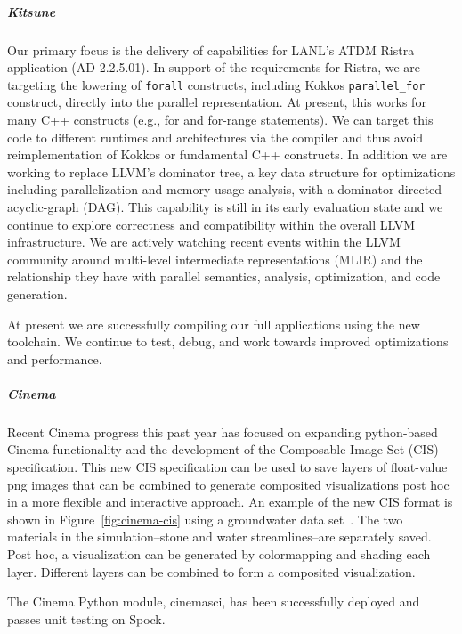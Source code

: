 \subparagraph{Kitsune}
Our primary focus is the delivery of capabilities for LANL's ATDM
Ristra application (AD 2.2.5.01).  In support of the requirements for
Ristra, we are targeting the lowering of \texttt{forall} constructs,
including Kokkos \texttt{parallel\_for} construct, directly into the
parallel representation.  At present, this works for many C++ constructs
(e.g., for and for-range statements).  We can target this code to different
runtimes and architectures via the compiler and thus avoid reimplementation
of Kokkos or fundamental C++ constructs. In addition we are working to replace
LLVM's dominator tree, a key data structure for optimizations including
parallelization and memory usage analysis, with a dominator directed-acyclic-graph
(DAG).  This capability is still in its early evaluation state and we continue to
explore correctness and compatibility within the overall LLVM infrastructure. We are
actively watching recent events within the LLVM community around
multi-level intermediate representations (MLIR) and the relationship
they have with parallel semantics, analysis, optimization, and code
generation.

At present we are successfully compiling our full applications using the new
toolchain.  We continue to test, debug, and work towards improved optimizations
and performance. 

\subparagraph{Cinema}
Recent Cinema progress this past year has focused on expanding python-based Cinema functionality and the development of the Composable Image Set (CIS) specification. This new CIS specification can be used to save layers of float-value png images that can be combined to generate composited visualizations post hoc in a more flexible and interactive approach.  An example of the new CIS format is shown in Figure~\ref{fig:cinema-cis} using a groundwater data set~\cite{cis:garcia:limestone}.  The two materials in the simulation--stone and water streamlines--are separately saved.  Post hoc, a visualization can be generated by colormapping and shading each layer.  Different layers can be combined to form a composited visualization.

The Cinema Python module, cinemasci, has been successfully deployed and passes unit testing on Spock.

